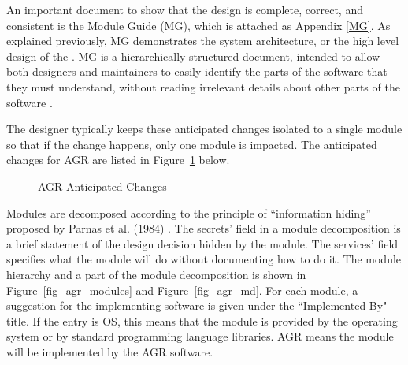 An important document to show that the design is complete, correct, and consistent is the Module Guide (MG), which is attached as Appendix \ref{MG}. As explained previously, MG demonstrates the system architecture, or the high level design of the \progname{}. MG is a hierarchically-structured document, intended to allow both designers and maintainers to easily identify  the parts of the software that they must understand, without reading irrelevant details about other parts of the software \cite{ParnasEtAl1984}. 

The designer typically keeps these anticipated changes isolated to a single module so that if the change happens, only one module is impacted. The anticipated changes for AGR are listed in Figure~\ref{fig_agr_ac} below.

\begin{figure}[H]
    \centering
    \caption[AGR Anticipated Changes]{AGR Anticipated Changes}
    \label{fig_agr_ac}
\end{figure}

Modules are decomposed according to the principle of “information hiding” proposed by Parnas et al. (1984) \citep{ParnasEtAl1984}. The secrets' field in a module decomposition is a brief statement of the design decision hidden by the module. The services' field specifies what the module will do without documenting how to do it. The module hierarchy and a part of the module decomposition is shown in Figure~\ref{fig_agr_modules} and Figure~\ref{fig_agr_md}. For each module, a suggestion for the implementing software is given under the ``Implemented By" title. If the entry is OS, this means that the module is provided by the operating system or by standard programming language libraries. AGR means the module will be implemented by the AGR software.

